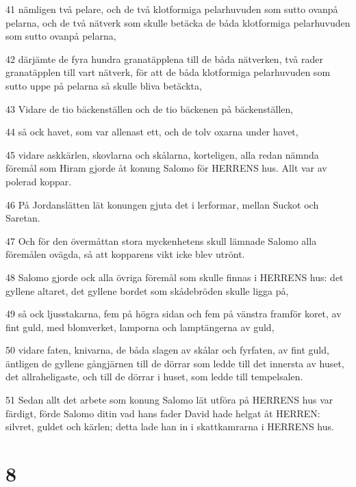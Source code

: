 \par 41 nämligen två pelare, och de två klotformiga pelarhuvuden som sutto ovanpå pelarna, och de två nätverk som skulle betäcka de båda klotformiga pelarhuvuden som sutto ovanpå pelarna,
\par 42 därjämte de fyra hundra granatäpplena till de båda nätverken, två rader granatäpplen till vart nätverk, för att de båda klotformiga pelarhuvuden som sutto uppe på pelarna så skulle bliva betäckta,
\par 43 Vidare de tio bäckenställen och de tio bäckenen på bäckenställen,
\par 44 så ock havet, som var allenast ett, och de tolv oxarna under havet,
\par 45 vidare askkärlen, skovlarna och skålarna, korteligen, alla redan nämnda föremål som Hiram gjorde åt konung Salomo för HERRENS hus. Allt var av polerad koppar.
\par 46 På Jordanslätten lät konungen gjuta det i lerformar, mellan Suckot och Saretan.
\par 47 Och för den övermåttan stora myckenhetens skull lämnade Salomo alla föremålen ovägda, så att kopparens vikt icke blev utrönt.
\par 48 Salomo gjorde ock alla övriga föremål som skulle finnas i HERRENS hus: det gyllene altaret, det gyllene bordet som skådebröden skulle ligga på,
\par 49 så ock ljusstakarna, fem på högra sidan och fem på vänstra framför koret, av fint guld, med blomverket, lamporna och lamptängerna av guld,
\par 50 vidare faten, knivarna, de båda slagen av skålar och fyrfaten, av fint guld, äntligen de gyllene gångjärnen till de dörrar som ledde till det innersta av huset, det allraheligaste, och till de dörrar i huset, som ledde till tempelsalen.
\par 51 Sedan allt det arbete som konung Salomo lät utföra på HERRENS hus var färdigt, förde Salomo ditin vad hans fader David hade helgat åt HERREN: silvret, guldet och kärlen; detta lade han in i skattkamrarna i HERRENS hus.

\chapter{8}


